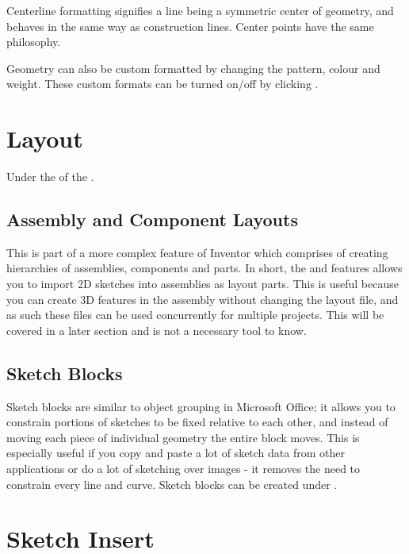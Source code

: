 \begin{enumerate}
Centerline formatting signifies a line being a symmetric center of geometry, and behaves in the same way as construction lines. Center points have the same philosophy.

Geometry can also be custom formatted by changing the pattern, colour and weight. These custom formats can be turned on/off by clicking .

\section{Layout}

\harddifficulty

\begin{where-to-find}
    Under the  of the .
    \end{where-to-find}
\subsection{Assembly and Component Layouts}


This is part of a more complex feature of Inventor which comprises of creating hierarchies of assemblies, components and parts. In short, the  and \newline {} features allows you to import 2D sketches into assemblies as layout parts. This is useful because you can create 3D features in the assembly without changing the layout file, and as such these files can be used concurrently for multiple projects. This will be covered in a later section and is not a necessary tool to know.

\subsection{Sketch Blocks}

\mediumdifficulty
Sketch blocks are similar to object grouping in Microsoft Office; it allows you to constrain portions of sketches to be fixed relative to each other, and instead of moving each piece of individual geometry the entire block moves. This is especially useful if you copy and paste a lot of sketch data from other applications or do a lot of sketching over images - it removes the need to constrain every line and curve. Sketch blocks can be created under .

\section{Sketch Insert}
\easydifficulty


\end{enumerate}
